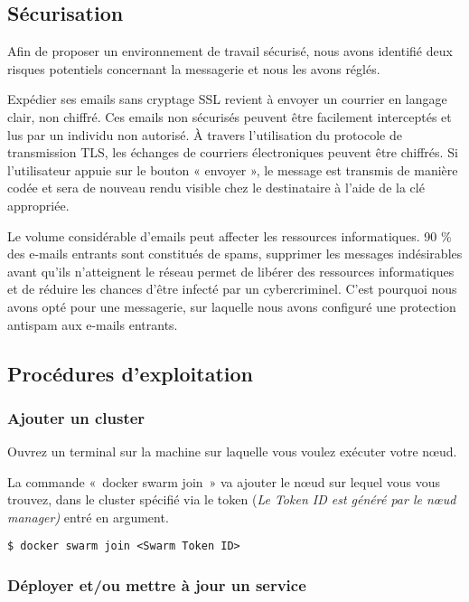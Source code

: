 \subsection{Sécurisation }

Afin de proposer un environnement de travail sécurisé, nous avons
identifié deux risques potentiels concernant la messagerie et nous les
avons réglés.

Expédier ses emails sans cryptage SSL revient à envoyer un courrier en
langage clair, non chiffré. Ces emails non sécurisés peuvent être
facilement interceptés et lus par un individu non autorisé. À travers
l'utilisation du protocole de transmission TLS, les échanges de
courriers électroniques peuvent être chiffrés. Si l'utilisateur appuie
sur le bouton « envoyer », le message est transmis de manière codée et
sera de nouveau rendu visible chez le destinataire à l'aide de la clé
appropriée.

Le volume considérable d'emails peut affecter les ressources
informatiques. 90 \% des e-mails entrants sont constitués de spams,
supprimer les messages indésirables avant qu'ils n'atteignent le réseau
permet de libérer des ressources informatiques et de réduire les chances
d'être infecté par un cybercriminel. C'est pourquoi nous avons opté pour
une messagerie, sur laquelle nous avons configuré une protection
antispam aux e-mails entrants.

\subsection{Procédures d'exploitation}

\subsubsection{Ajouter un cluster}

Ouvrez un terminal sur la machine sur laquelle vous voulez exécuter
votre nœud.

La commande «~docker swarm join~» va ajouter le nœud sur lequel vous
vous trouvez, dans le cluster spécifié via le token (\emph{Le Token ID
est généré par le nœud manager)} entré en argument.

\begin{lstlisting}
$ docker swarm join <Swarm Token ID>
\end{lstlisting}

\subsubsection{Déployer et/ou mettre à jour un service}

